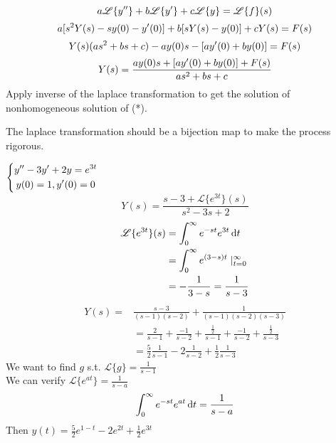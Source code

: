 \[a\mathscr{L}\{y^{\prime\prime}\}+b\mathscr{L}\{y^{\prime}\}+c\mathscr{L}\{y\}=\mathscr{L}\{f\}(s)
\]
\[a[s^2Y(s)-sy(0)-y^{\prime}(0)]+b[sY(s)-y(0)]+cY(s)=F(s)
\]
\[Y(s)(as^2+bs+c)-ay(0)s-[ay^{\prime}(0)+by(0)]=F(s)\]
\[Y(s)=\frac{ay(0)s+[ay^{\prime}(0)+by(0)]+F(s)}{as^2+bs+c}
\]
Apply inverse of the laplace transformation to get the solution of nonhomogeneous solution of (*).
\begin{remark}
The laplace transformation should be a bijection map to make the process rigorous.
\end{remark}
\begin{example}
$\left \{	\begin{gathered}
y^{\prime\prime}-3y^{\prime}+2y=e^{3t}	\\
y(0)=1, y^{\prime}(0)=0
\end{gathered}	\right.$\\
\[Y(s)=\frac{s-3+\mathscr{L}\{e^{3t}\}(s)}{s^2-3s+2}
\]
\[\begin{aligned}
\mathscr{L}\{e^{3t}\}(s)&=\int_0^\infty e^{-st}e^{3t}\,\mathrm{d} t\\
&=\int_0^\infty e^{(3-s)t}\mid_{t=0}^\infty\\
&=-\frac{1}{3-s}=\frac{1}{s-3}
\end{aligned}
\]
\[
\begin{aligned}Y(s)=&\frac{s-3}{(s-1)(s-2)}+\frac{1}{(s-1)(s-2)(s-3)}\\
&=\frac{2}{s-1}+\frac{-1}{s-2}+\frac{\frac{1}{2}}{s-1}+\frac{-1}{s-2}+\frac{\frac{1}{2}}{s-3}\\
&=\frac{5}{2}\frac{1}{s-1}-2\frac{1}{s-2}+\frac{1}{2}\frac{1}{s-3}
\end{aligned}
\]
We want to find $g$ s.t. $\mathscr{L}\{g\}=\frac{1}{s-1}$\\
We can verify $\mathscr{L}\{e^{at}\}=\frac{1}{s-a}$\\
\[\int_0^\infty e^{-st}e^{at}\,\mathrm{d} t=\frac{1}{s-a}
\]
Then $y(t)=\frac{5}{2}e^{1-t}-2e^{2t}+\frac{1}{2}e^{3t}$
\end{example}
